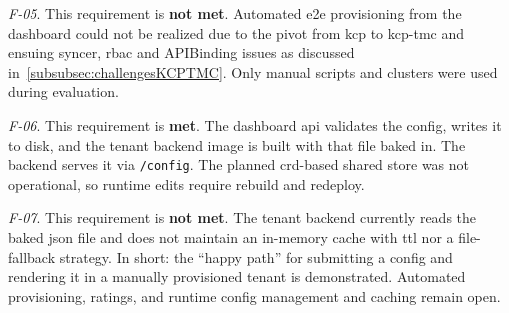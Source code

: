 \documentclass[11pt, a4paper, oneside, listof=totoc]{scrartcl}
\begin{document}
\begin{enumerate}[label={[\arabic*]:},
                    ref=Challenge~\arabic*,
                    leftmargin=*,
                    itemsep=0.6\baselineskip]
                    \item\label{chal:evalF05}
                        \textit{F-05}.
                        This requirement is \textbf{not met}.
                        Automated \gls{e2e} provisioning from the dashboard could not be realized
                        due to the pivot from \gls{kcp} to \gls{kcp}-\gls{tmc} and ensuing syncer,
                        \gls{rbac} and APIBinding issues as discussed
                        in~\autoref{subsubsec:challengesKCPTMC}.
                        Only manual scripts and clusters were used during evaluation.

                    \item\label{chal:evalF06}
                        \textit{F-06}.
                        This requirement is \textbf{met}.
                        The dashboard \gls{api} validates the config, writes it to disk, and the
                        tenant backend image is built with that file baked in.
                        The backend serves it via \texttt{/config}.
                        The planned \gls{crd}-based shared store was not operational, so runtime
                        edits require rebuild and redeploy.

                    \item\label{chal:evalF07}
                        \textit{F-07}.
                        This requirement is \textbf{not met}.
                        The tenant backend currently reads the baked \gls{json} file and does not
                        maintain an in-memory cache with \gls{ttl} nor a file-fallback strategy.
                        In short: the \enquote{happy path} for submitting a config and rendering it
                        in a manually provisioned tenant is demonstrated.
                        Automated provisioning, ratings, and runtime config management and caching
                        remain open.
            \end{enumerate}
                
\end{document}
